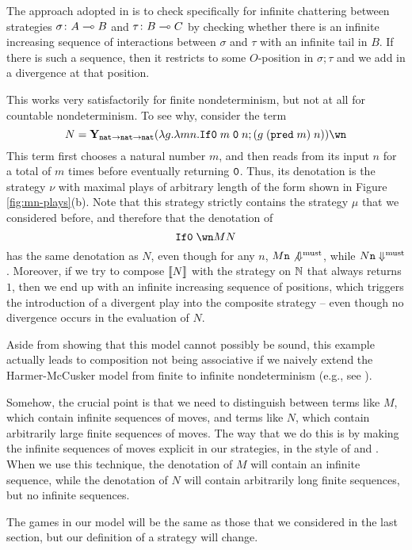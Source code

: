 \documentclass[sigplan,9pt,review]{acmart}\settopmatter{printfolios=true,printccs=false,printacmref=false}
\begin{document}
The approach adopted in \cite{mcCHFiniteND} is to check specifically for infinite chattering between strategies $\sigma\colon A\multimap B$ and $\tau\colon B\multimap C$ by checking whether there is an infinite increasing sequence of interactions between $\sigma$ and $\tau$ with an infinite tail in $B$.  
If there is such a sequence, then it restricts to some $O$-position in $\sigma;\tau$ and we add in a divergence at that position.  

This works very satisfactorily for finite nondeterminism, but not at all for countable nondeterminism.  
To see why, consider the term
\[
  N = \Y_{\nat\to\nat\to\nat}(\lambda g.\lambda m n.\IfO m\;\0\;n;(g\;(\pred m)\;n))\wn
  \]
This term first chooses a natural number $m$, and then reads from its input $n$ for a total of $m$ times before eventually returning ${\mathtt{0}}$.  
Thus, its denotation is the strategy $\nu$ with maximal plays of arbitrary length of the form shown in Figure \ref{fig:mn-plays}(b).
Note that this strategy strictly contains the strategy $\mu$ that we considered before, and therefore that the denotation of
\[
  \IfO \wn M N
  \]
has the same denotation as $N$, even though for any $n$, $M{\mathtt{n}}\not{\Downarrow^{\text{must}}}$, while $N{\mathtt{n}}\Downarrow^{\text{must}}$.
Moreover, if we try to compose $\left\llbracket N\right\rrbracket$ with the strategy on $\mathbb{N}$ that always returns $1$, then we end up with an infinite increasing sequence of positions, which triggers the introduction of a divergent play into the composite strategy -- even though no divergence occurs in the evaluation of $N$.

Aside from showing that this model cannot possibly be sound, this example actually leads to composition not being associative if we naively extend the Harmer-McCusker model from finite to infinite nondeterminism (e.g., see \cite[4.4.1]{RusssThesis}).  

Somehow, the crucial point is that we need to distinguish between terms like $M$, which contain infinite sequences of moves, and terms like $N$, which contain arbitrarily large finite sequences of moves.  
The way that we do this is by making the infinite sequences of moves explicit in our strategies, in the style of \cite{RoscoeCspInfinite} and \cite{LevyGsInfinite}.  
When we use this technique, the denotation of $M$ will contain an infinite sequence, while the denotation of $N$ will contain arbitrarily long finite sequences, but no infinite sequences.  

The games in our model will be the same as those that we considered in the last section, but our definition of a strategy will change.
\end{document}
